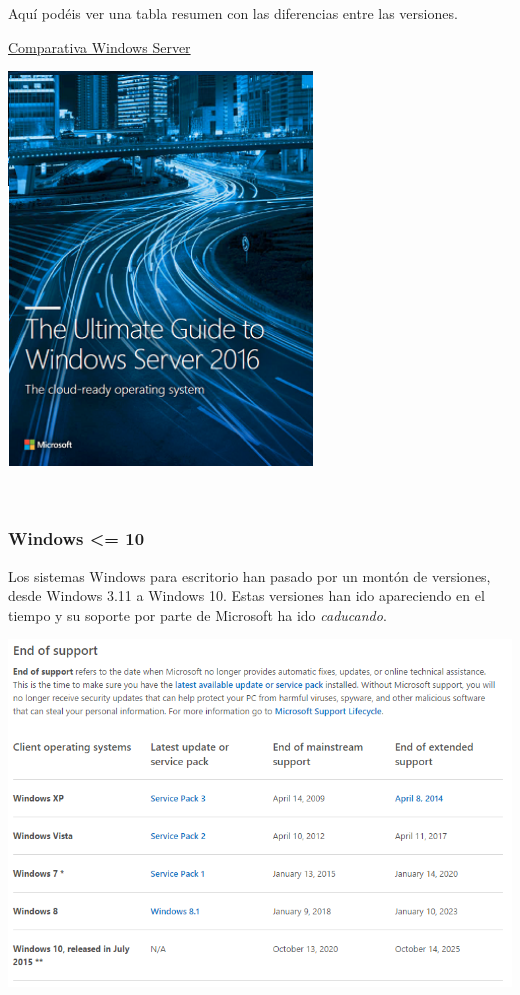 \documentclass[11pt]{article}
\begin{document}
Aquí podéis ver una tabla resumen con las diferencias entre las
versiones.

\href{https://www.microsoft.com/es-mx/cloud-platform/windows-server-comparison}{Comparativa
Windows Server}

\begin{center}
\includegraphics[width=.9\linewidth]{Versiones/WindowsServer_cover.png}
\end{center}  

\subsubsection{Windows <= 10}
\label{sec:org99fd048}
Los sistemas Windows para escritorio han pasado por un montón de
versiones, desde Windows 3.11 a Windows 10. Estas versiones han ido
apareciendo en el tiempo y su soporte por parte de Microsoft ha ido
\emph{caducando}.

\begin{center}
\includegraphics[width=.9\linewidth]{Versiones/fin-soporte-windows.png}
\end{center}  
\end{document}
